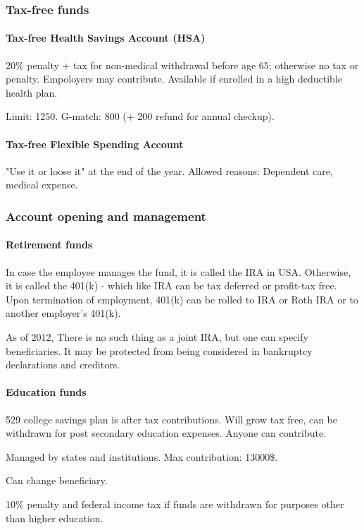 \documentclass[oneside, article]{memoir}
\begin{document}
\subsubsection{Tax-free funds}
\paragraph{Tax-free Health Savings Account (HSA)}
20\% penalty + tax for non-medical withdrawal before age 65; otherwise no tax or penalty. Empoloyers may contribute. Available if enrolled in a high deductible health plan.

Limit: 1250.  G-match: 800 (+ 200 refund for annual checkup).

\paragraph{Tax-free Flexible Spending Account}
"Use it or loose it" at the end of the year. Allowed reasons: Dependent care, medical expense.

\subsubsection{Account opening and management}
\paragraph{Retirement funds}
In case the employee manages the fund, it is called the IRA in USA. Otherwise, it is called the 401(k) - which like IRA can be tax deferred or profit-tax free. Upon termination of employment, 401(k) can be rolled to IRA or Roth IRA or to another employer's 401(k).

As of 2012, There is no such thing as a joint IRA, but one can specify beneficiaries. It may be protected from being considered in bankruptcy declarations and creditors.

\paragraph{Education funds}
529 college savings plan is after tax contributions. Will grow tax free, can be withdrawn for post secondary education expenses. Anyone can contribute.

Managed by states and institutions. Max contribution: 13000\$.

Can change beneficiary.

10\% penalty and federal income tax if funds are withdrawn for purposes other than higher education.  
\end{document}

